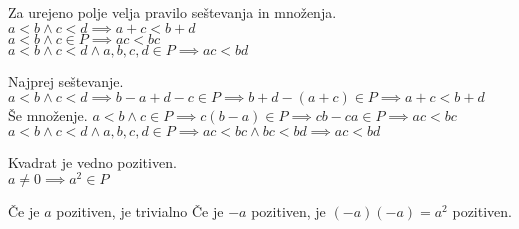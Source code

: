 \begin{trditev}
    Za urejeno polje velja pravilo seštevanja in množenja. \\
    $a < b \wedge c < d \implies a + c < b + d$ \\
    $a < b \wedge c \in P \implies ac < bc$ \\
    $a < b \wedge c < d \wedge a, b, c, d \in P \implies ac < bd$
\end{trditev}
\begin{dokaz}
    Najprej seštevanje.
    $a < b \wedge c < d \implies b - a + d - c \in P \implies b + d - (a + c) \in P \implies a + c < b + d$ \\
    Še množenje.
    $a < b \wedge c \in P \implies c(b - a) \in P \implies cb - ca \in P \implies ac < bc$ \\
    $a < b \wedge c < d \wedge a, b, c, d \in P \implies ac < bc \wedge bc < bd \implies ac < bd$
\end{dokaz}

\begin{trditev}
    Kvadrat je vedno pozitiven. \\
    $a \neq 0 \implies a^2 \in P$
\end{trditev}
\begin{dokaz}
    Če je $a$ pozitiven, je trivialno
    Če je $-a$ pozitiven, je $(-a)(-a) = a^2$ pozitiven.
\end{dokaz}
